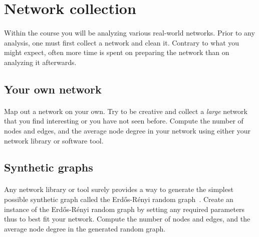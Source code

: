 \documentclass[11pt,a4paper]{article}
\begin{document}
%

\section{Network collection}

\paragraph{} Within the course you will be analyzing various real-world networks. Prior to any analysis, one must first collect a network and clean it. Contrary to what you might expect, often more time is spent on preparing the network than on analyzing it afterwards.

\subsection{Your own network}

\paragraph{} Map out a network on your own. Try to be creative and collect a \textit{large} network that you find interesting or you have not seen before. Compute the number of nodes and edges, and the average node degree in your network using either your network library or software tool.

\subsection{Synthetic graphs}

\paragraph{} Any network library or tool surely provides a way to generate the simplest possible synthetic graph called the Erd\H{o}s-R\'{e}nyi random graph~\cite{ER59}. Create an instance of the Erd\H{o}s-R\'{e}nyi random graph by setting any required parameters thus to best fit your network. Compute the number of nodes and edges, and the average node degree in the generated random graph.
\end{document}
